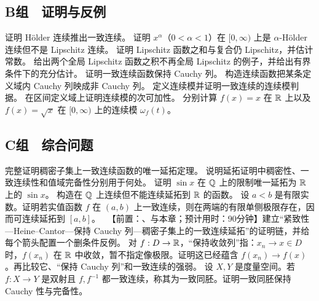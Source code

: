 \subsection*{B组　证明与反例}
\begin{enumerate}[label=\textbf{\thechapter.\arabic*.},resume]
  证明 Hölder 连续推出一致连续。
  证明 \(x^\alpha\)（\(0<\alpha<1\)）在 \([0,\infty)\) 上是 \(\alpha\)-Hölder 连续但不是 Lipschitz 连续。
  证明 Lipschitz 函数之和与复合仍 Lipschitz，并估计常数。
  给出两个全局 Lipschitz 函数之积不再全局 Lipschitz 的例子，并给出有界条件下的充分估计。
  证明一致连续函数保持 Cauchy 列。
  构造连续函数把某条定义域内 Cauchy 列映成非 Cauchy 列。
  定义连续模并证明一致连续的连续模判据。
  在区间定义域上证明连续模的次可加性。
  分别计算 \(f(x)=x\) 在 \(\mathbb{R}\) 上以及 \(f(x)=\sqrt x\) 在 \([0,\infty)\) 上的连续模 \(\omega_f(t)\)。
\end{enumerate}

\subsection*{C组　综合问题}
\begin{enumerate}[label=\textbf{\thechapter.\arabic*.},resume]
  完整证明稠密子集上一致连续函数的唯一延拓定理。
  说明延拓证明中稠密性、一致连续性和值域完备性分别用于何处。
  证明 \(\sin x\) 在 \(\mathbb{Q}\) 上的限制唯一延拓为 \(\mathbb{R}\) 上的 \(\sin x\)。
  构造在 \(\mathbb{Q}\) 上连续但不能连续延拓到 \(\mathbb{R}\) 的函数。
  设 \(a<b\) 是有限实数。证明若实值函数 \(f\) 在 \((a,b)\) 上一致连续，则在两端的有限单侧极限存在，因而可连续延拓到 \([a,b]\)。
  \ 【前置：、与本章；预计用时：90分钟】建立“紧致性—Heine--Cantor—保持 Cauchy 列—稠密子集上的一致连续延拓”的证明链，并给每个箭头配置一个删条件反例。
  对 \(f:D\to\mathbb{R}\)，“保持收敛列”指：\(x_n\to x\in D\) 时，\(f(x_n)\) 在 \(\mathbb{R}\) 中收敛，暂不指定像极限。证明这已经蕴含 \(f(x_n)\to f(x)\)。再比较它、“保持 Cauchy 列”和一致连续的强弱。
  设 \(X,Y\) 是度量空间。若 \(f:X\to Y\) 是双射且 \(f,f^{-1}\) 都一致连续，称其为一致同胚。证明一致同胚保持 Cauchy 性与完备性。
\end{enumerate}

